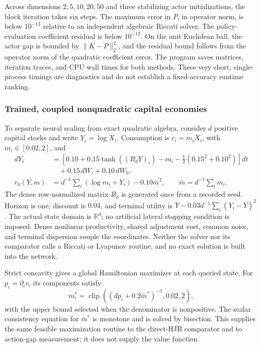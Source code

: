 \documentclass[ecta,nameyear,draft]{econsocart}
\theoremstyle{definition}
\theoremstyle{remark}
\newcommand{\R}{\mathbb R}
\begin{document}
Across dimensions $2,5,10,20,50$ and three stabilizing actor initializations, the block iteration takes six steps. The maximum error in $P$, in operator norm, is below $10^{-13}$ relative to an independent algebraic Riccati solver. The policy-evaluation coefficient residual is below $10^{-12}$. On the unit Euclidean ball, the actor gap is bounded by $\|K-P\|_2^2$, and the residual bound follows from the operator norm of the quadratic coefficient error. The program saves matrices, iteration traces, and CPU wall times for both methods. These very short, single-process timings are diagnostics and do not establish a fixed-accuracy runtime ranking.


\subsubsection{Trained, coupled nonquadratic capital economies}\label{sec:coupled-neural}
To separate neural scaling from exact quadratic algebra, consider $d$ positive capital stocks and write $Y_i=\log X_i$. Consumption is $c_i=m_iX_i$, with $m_i\in[0.02,2]$, and
\begin{align}\label{eq:coupled-r6}
 dY_i&=\left[0.10+0.15\tanh((B_dY)_i)-m_i-\tfrac12(0.15^2+0.10^2)\right]dt\nonumber\\
       &\quad+0.15\,dW_i+0.10\,dW_0,\\
 r_0(Y,m)&=d^{-1}\sum_i(\log m_i+Y_i)-0.10\bar m^2,
 \qquad \bar m=d^{-1}\sum_i m_i.\nonumber
\end{align}
The dense row-normalized matrix $B_d$ is generated once from a recorded seed. Horizon is one, discount is $0.04$, and terminal utility is $\bar Y-0.03d^{-1}\sum_i(Y_i-\bar Y)^2$. The actual state domain is $\R^d$; no artificial lateral stopping condition is imposed. Dense nonlinear productivity, shared adjustment cost, common noise, and terminal dispersion couple the coordinates. Neither the solver nor its comparator calls a Riccati or Lyapunov routine, and no exact solution is built into the network.

Strict concavity gives a global Hamiltonian maximizer at each queried state. For $p_i=\partial_i v$, its components satisfy
\[
 m_i^*=\operatorname{clip}\left((dp_i+0.2\bar m^*)^{-1},0.02,2\right),
\]
with the upper bound selected when the denominator is nonpositive. The scalar consistency equation for $\bar m^*$ is monotone and is solved by bisection. This supplies the same feasible maximization routine to the direct-HJB comparator and to action-gap measurement; it does not supply the value function.
\end{document}
